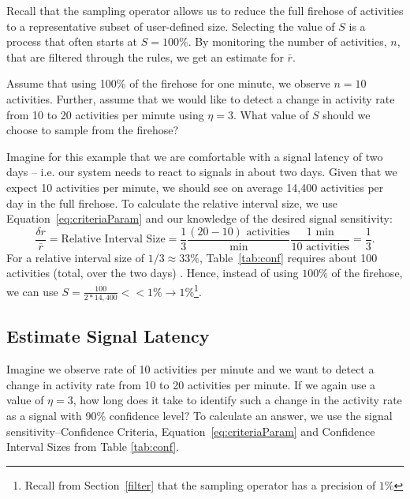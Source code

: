 \documentclass{article}
\begin{document}
Recall that the sampling operator allows us to reduce the full firehose of activities to a representative 
subset of user-defined size. Selecting the value of $S$ is a process that often starts at $S =100\%$.  
By monitoring the number of activities, $n$, that are filtered through the rules, we get an 
estimate for $\bar{r}$.

Assume that using 100\% of the firehose for one minute, we observe $n = 10$ activities. Further, assume 
that we would like to detect a change in activity rate from 10 to 20 activities per minute using 
$\eta = 3$. What value of $S$ should we choose to sample from the firehose?

Imagine for this example that we are comfortable with a signal latency of two days -- i.e. our system 
needs to react to signals in about two days. Given that we expect 10 activities per minute, we should 
see on average 14,400 activities per day in the full firehose. To calculate the relative interval size, we
use Equation~\ref{eq:criteriaParam} and our knowledge of the desired signal sensitivity:
\begin{equation}
\label{eq:ex1:criteria}
\frac{\delta r}{\bar{r}} = \text{Relative Interval Size} = 
	\frac{1}{3} 
	\frac{(20-10) \text{ activities}}{\text{min}} 
	\frac{1 \text{ min}}{10 \text{ activities}} = \frac{1}{3}.
\end{equation}
For a relative interval size of $1/3 \approx 33\%$, Table~\ref{tab:conf}
requires about 100 activities (total, over the two days) . Hence, instead of
using $100\%$ of the firehose, we can use $S = \frac{100}{2*14,400} << 1\%
\rightarrow 1\%$\footnote{Recall from Section~\ref{filter} that the sampling
operator has a precision of $1\%$}.



   
\subsection{Estimate Signal Latency} 
\label{ex:2}


Imagine we observe rate of 10 activities per minute and we want to detect a change in activity 
rate from 10  to 20 activities per minute.  If we again use a value of $\eta = 3$, how long 
does it take to identify such a change in 
the activity rate as a signal with 90\% confidence level? To calculate an answer, we use the 
signal sensitivity--Confidence Criteria, Equation~\ref{eq:criteriaParam} and Confidence Interval 
Sizes from Table \ref{tab:conf}.
\end{document}

